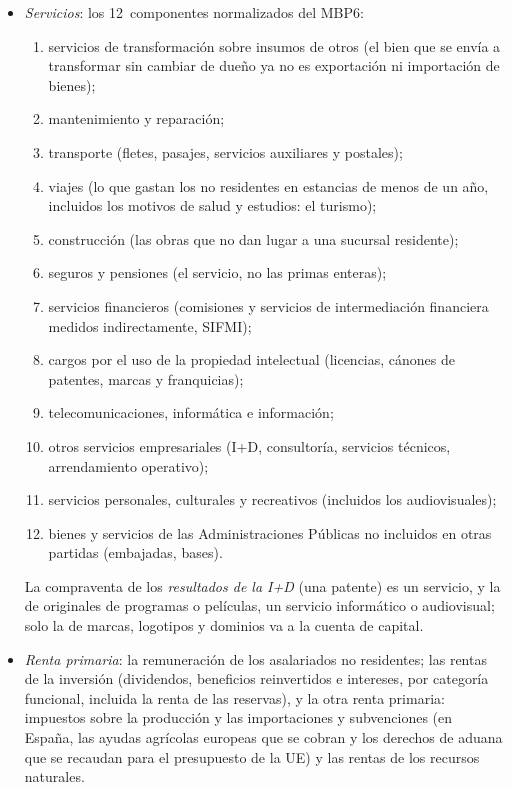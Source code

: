 \documentclass[11pt]{article}
\begin{document}
\begin{itemize}
\item \emph{Servicios}: los 12~componentes normalizados del MBP6\nocite{FMI2009MBP6}:
  \begin{enumerate}
  \item servicios de transformación sobre insumos de otros (el bien que se envía a transformar sin cambiar de dueño ya no es exportación ni importación de bienes);
  \item mantenimiento y reparación;
  \item transporte (fletes, pasajes, servicios auxiliares y postales);
  \item viajes (lo que gastan los no residentes en estancias de menos de un año, incluidos los motivos de salud y estudios: el turismo);
  \item construcción (las obras que no dan lugar a una sucursal residente);
  \item seguros y pensiones (el servicio, no las primas enteras);
  \item servicios financieros (comisiones y servicios de intermediación financiera medidos indirectamente, SIFMI);
  \item cargos por el uso de la propiedad intelectual (licencias, cánones de patentes, marcas y franquicias);
  \item telecomunicaciones, informática e información;
  \item otros servicios empresariales (I+D, consultoría, servicios técnicos, arrendamiento operativo);
  \item servicios personales, culturales y recreativos (incluidos los audiovisuales);
  \item bienes y servicios de las Administraciones Públicas no incluidos en otras partidas (embajadas, bases).
  \end{enumerate}
  La compraventa de los \emph{resultados de la I+D} (una patente) es un servicio, y la de originales de programas o películas, un servicio informático o audiovisual; solo la de marcas, logotipos y dominios va a la cuenta de capital.
\item \emph{Renta primaria}\nocite{FMI2009MBP6}: la remuneración de los asalariados no residentes; las rentas de la inversión (dividendos, beneficios reinvertidos e intereses, por categoría funcional, incluida la renta de las reservas), y la otra renta primaria: impuestos sobre la producción y las importaciones y subvenciones (en España, las ayudas agrícolas europeas que se cobran y los derechos de aduana que se recaudan para el presupuesto de la UE) y las rentas de los recursos naturales.

\end{itemize}
\end{document}
